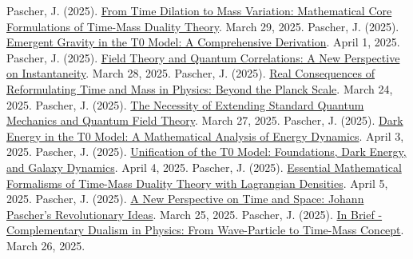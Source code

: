 \documentclass[12pt,a4paper]{article}
\begin{document}
\begin{thebibliography}{99}
		 Pascher, J. (2025). \href{https://github.com/jpascher/T0-Time-Mass-Duality/tree/main/2/pdf/English/MathZeitMasseLagrangeEn.pdf}{From Time Dilation to Mass Variation: Mathematical Core Formulations of Time-Mass Duality Theory}. March 29, 2025.
		 Pascher, J. (2025). \href{https://github.com/jpascher/T0-Time-Mass-Duality/tree/main/2/pdf/English/EmergentGravT0En.pdf}{Emergent Gravity in the T0 Model: A Comprehensive Derivation}. April 1, 2025.
		 Pascher, J. (2025). \href{https://github.com/jpascher/T0-Time-Mass-Duality/tree/main/2/pdf/English/FeldtheorieQuantenEn.pdf}{Field Theory and Quantum Correlations: A New Perspective on Instantaneity}. March 28, 2025.
		 Pascher, J. (2025). \href{https://github.com/jpascher/T0-Time-Mass-Duality/tree/main/2/pdf/English/JenseitsPlanckEn.pdf}{Real Consequences of Reformulating Time and Mass in Physics: Beyond the Planck Scale}. March 24, 2025.
		 Pascher, J. (2025). \href{https://github.com/jpascher/T0-Time-Mass-Duality/tree/main/2/pdf/English/NotwendigkeitQMErweiterungEn.pdf}{The Necessity of Extending Standard Quantum Mechanics and Quantum Field Theory}. March 27, 2025.
		 Pascher, J. (2025). \href{https://github.com/jpascher/T0-Time-Mass-Duality/tree/main/2/pdf/English/MathEnergiedynamikEn.pdf}{Dark Energy in the T0 Model: A Mathematical Analysis of Energy Dynamics}. April 3, 2025.
		 Pascher, J. (2025). \href{https://github.com/jpascher/T0-Time-Mass-Duality/tree/main/2/pdf/English/T0VereinheitlichungDEGalEn.pdf}{Unification of the T0 Model: Foundations, Dark Energy, and Galaxy Dynamics}. April 4, 2025.
		 Pascher, J. (2025). \href{https://github.com/jpascher/T0-Time-Mass-Duality/tree/main/2/pdf/English/MathZeitMasseLagrangeEn.pdf}{Essential Mathematical Formalisms of Time-Mass Duality Theory with Lagrangian Densities}. April 5, 2025.
		 Pascher, J. (2025). \href{https://github.com/jpascher/T0-Time-Mass-Duality/tree/main/2/pdf/English/ZeitRaumPascherEn.pdf}{A New Perspective on Time and Space: Johann Pascher’s Revolutionary Ideas}. March 25, 2025.
		 Pascher, J. (2025). \href{https://github.com/jpascher/T0-Time-Mass-Duality/tree/main/2/pdf/English/KurzKomplementDualPhysikEn.pdf}{In Brief - Complementary Dualism in Physics: From Wave-Particle to Time-Mass Concept}. March 26, 2025.

\end{thebibliography}
\end{document}
